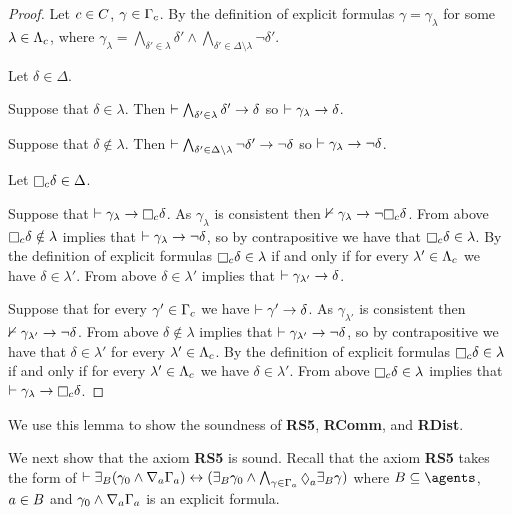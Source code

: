 \begin{proof}
    Let $c \in C$, $\gamma \in \Gamma_c$.
    By the definition of explicit formulas $\gamma = \gamma_\lambda$ for some $\lambda \in \Lambda_c$, where $\gamma_\lambda = \bigwedge_{\delta' \in \lambda} \delta' \land \bigwedge_{\delta' \in \Delta \setminus \lambda} \lnot \delta'$.

    Let $\delta \in \Delta$.

    Suppose that $\delta \in \lambda$.
    Then $\vdash \bigwedge_{\delta' \in \lambda} \delta' \rightarrow \delta$ so $\vdash \gamma_\lambda \rightarrow \delta$.

    Suppose that $\delta \notin \lambda$.
    Then $\vdash \bigwedge_{\delta' \in \Delta \setminus \lambda} \lnot \delta' \rightarrow \lnot \delta$ so $\vdash \gamma_\lambda \rightarrow \lnot \delta$.

    Let $\necessaryC \delta \in \Delta$.

    Suppose that $\proves \gamma_\lambda \implies \necessaryC \delta$.
    As $\gamma_\lambda$ is consistent then $\nproves \gamma_\lambda \implies \lnot \necessaryC \delta$.
    From above $\necessaryC \delta \notin \lambda$ implies that $\vdash \gamma_\lambda \rightarrow \lnot \delta$, so by contrapositive we have that $\necessaryC \delta \in \lambda$.
    By the definition of explicit formulas $\necessaryC \delta \in \lambda$ if and only if for every $\lambda' \in \Lambda_c$ we have $\delta \in \lambda'$.
    From above $\delta \in \lambda'$ implies that $\vdash \gamma_{\lambda'} \rightarrow \delta$.

    Suppose that for every $\gamma' \in \Gamma_c$ we have $\vdash \gamma' \rightarrow \delta$.
    As $\gamma_{\lambda'}$ is consistent then $\nvdash \gamma_{\lambda'} \rightarrow \lnot \delta$.
    From above $\delta \notin \lambda$ implies that $\vdash \gamma_{\lambda'} \rightarrow \lnot \delta$, so by contrapositive we have that $\delta \in \lambda'$ for every $\lambda' \in \Lambda_c$.
    By the definition of explicit formulas $\necessaryC \delta \in \lambda$ if and only if for every $\lambda' \in \Lambda_c$ we have $\delta \in \lambda'$.
    From above $\necessaryC \delta \in \lambda$ implies that $\proves \gamma_\lambda \implies \necessaryC \delta$.
\end{proof}

We use this lemma to show the soundness of {\bf RS5}, {\bf RComm}, and {\bf RDist}.

We next show that the axiom {\bf RS5} is sound.
Recall that the axiom {\bf RS5} takes the form of $\proves \somerefsBs (\gamma_0 \land \coversA \Gamma_\agentA) \iff (\somerefsBs \gamma_0 \land \bigwedge_{\gamma \in \Gamma_\agentA} \possibleA \somerefsBs \gamma)$ where $\agentsB \subseteq \agents$, $a \in B$ and $\gamma_0 \land \nabla_{a} \Gamma_a$ is an explicit formula.

